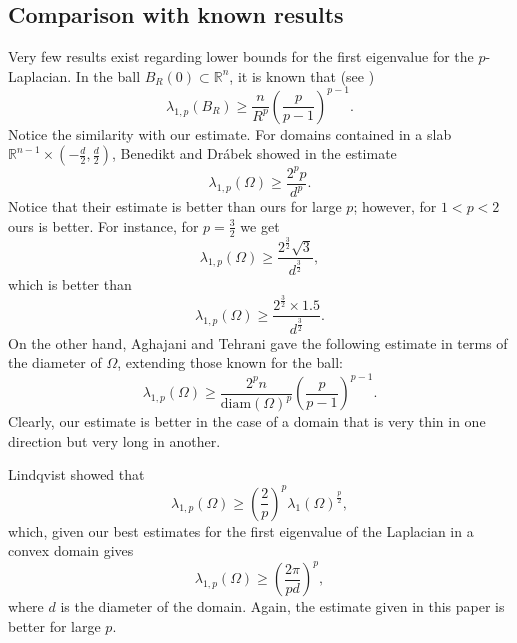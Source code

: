 \documentclass[11pt]{amsart}
\theoremstyle{definition}
\begin{document}
\subsection{Comparison with known results}
\label{section:known_results}
Very few results exist regarding lower bounds for the first eigenvalue for the $p$-Laplacian.
In the ball $B_{R}\left(0\right)\subset \mathbb{R}^n$, it is known that
(see \cite{BenediktDrabek2013})
\[
\lambda_{1,p}\left(B_R\right)\geq \frac{n}{R^p}\left(\frac{p}{p-1}\right)^{p-1}.
\]
Notice the similarity with our estimate. For domains contained in a slab
$\mathbb{R}^{n-1}\times \left(-\frac{d}{2},\frac{d}{2}\right)$, Benedikt and Dr\'abek
showed in \cite{BenediktDrabek2012} the estimate
\[
\lambda_{1,p}\left(\Omega\right)\geq \frac{2^p p}{d^p}.
\]
Notice that their estimate is better than ours for large $p$; however, for
$1<p<2$ ours is better. For instance, for $p=\frac{3}{2}$ we get
\[
\lambda_{1,p}\left(\Omega\right)\geq \frac{2^{\frac{3}{2}}\sqrt{3}}{d^{\frac{3}{2}}},
\]
which is better than
\[
\lambda_{1,p}\left(\Omega\right)\geq \frac{2^{\frac{3}{2}}\times 1.5}{d^{\frac{3}{2}}}.
\]
On the other hand, Aghajani and Tehrani gave the following estimate in terms of the
diameter of $\Omega$, extending those known for the ball:
\[
\lambda_{1,p}\left(\Omega\right)\geq \frac{2^p n}{\mbox{diam}\left(\Omega\right)^p}\left(\frac{p}{p-1}\right)^{p-1}.
\]
Clearly, our estimate is better in the case of a domain that
is very thin in one direction but very long in another.

\medskip
Lindqvist showed that
\[
\lambda_{1,p}\left(\Omega\right)\geq \left(\frac{2}{p}\right)^p\lambda_1\left(\Omega\right)^{\frac{p}{2}},
\]
which, given our best estimates for the first eigenvalue of the Laplacian in a convex domain gives
\[
\lambda_{1,p}\left(\Omega\right)\geq \left(\frac{2\pi}{p d}\right)^p,
\]
where $d$ is the diameter of the domain. Again, the estimate given
in this paper is better for large $p$.
\end{document}
